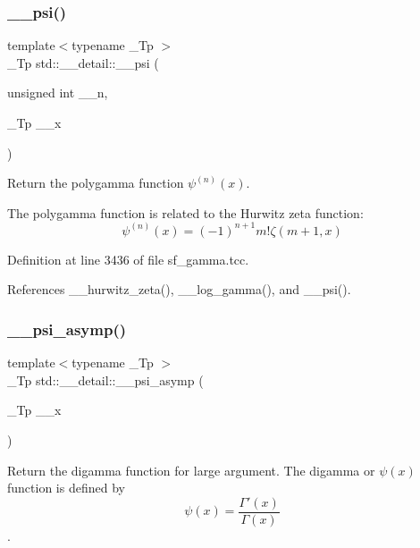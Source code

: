 \subsubsection{\texorpdfstring{\+\_\+\+\_\+psi()}{\_\_psi()}\hspace{0.1cm}{\footnotesize\ttfamily [3/3]}}
{\footnotesize\ttfamily template$<$typename \+\_\+\+Tp $>$ \\
\+\_\+\+Tp std\+::\+\_\+\+\_\+detail\+::\+\_\+\+\_\+psi (\begin{DoxyParamCaption}\item[{unsigned int}]{\+\_\+\+\_\+n,  }\item[{\+\_\+\+Tp}]{\+\_\+\+\_\+x }\end{DoxyParamCaption})}



Return the polygamma function $ \psi^{(n)}(x) $. 

The polygamma function is related to the Hurwitz zeta function\+: \[ \psi^{(n)}(x) = (-1)^{n+1} m! \zeta(m+1,x) \] 

Definition at line 3436 of file sf\+\_\+gamma.\+tcc.



References \+\_\+\+\_\+hurwitz\+\_\+zeta(), \+\_\+\+\_\+log\+\_\+gamma(), and \+\_\+\+\_\+psi().

\mbox{\label{namespacestd_1_1____detail_a2557b5d815b6667bc9228c1e8a2a16ae}} 
\subsubsection{\texorpdfstring{\+\_\+\+\_\+psi\+\_\+asymp()}{\_\_psi\_asymp()}}
{\footnotesize\ttfamily template$<$typename \+\_\+\+Tp $>$ \\
\+\_\+\+Tp std\+::\+\_\+\+\_\+detail\+::\+\_\+\+\_\+psi\+\_\+asymp (\begin{DoxyParamCaption}\item[{\+\_\+\+Tp}]{\+\_\+\+\_\+x }\end{DoxyParamCaption})}



Return the digamma function for large argument. The digamma or $ \psi(x) $ function is defined by \[ \psi(x) = \frac{\Gamma'(x)}{\Gamma(x)} \]. 

